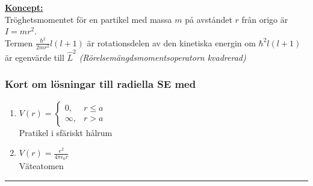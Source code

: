 \documentclass{article}
\begin{document}
    \underline{\textbf{Koncept:}}\\
    Tröghetsmomentet för en partikel med massa $m$ på avståndet $r$ från origo är $I=mr^2$.\\
    Termen $\frac{\hbar^2}{2mr^2}l(l+1)$ är rotationsdelen av den kinetiska energin om $\hbar^2l(l+1)$ är egenvärde till $\hat{L}^2$ \textit{(Rörelsemängdsmomentsoperatorn kvadrerad)}
    \subsubsection{Kort om lösningar till radiella SE med}
      \begin{enumerate}
        \item $V(r)=\begin{cases}
          0,&r\leq a\\
          \infty,&r>a
        \end{cases}$\\
        Pratikel i sfäriskt hålrum
        \item $V(r)=\frac{e^2}{4\pi\epsilon_0r}$\\
        Väteatomen
      \end{enumerate}
      \hrule
\end{document}

